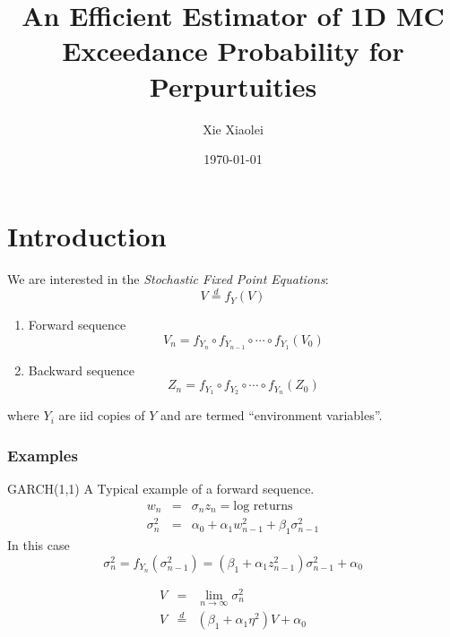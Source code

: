 \documentclass{beamer}
\title{An Efficient Estimator of 1D MC Exceedance Probability for Perpurtuities} %
\author{Xie Xiaolei} %
\institute[UCPH] %
{
Copenhagen University  \\ %
\medskip
\textit{xie@math.ku.dk} %
}
\date{\today} %
\begin{document}
\begin{frame}
\titlepage %
\end{frame}


\section{Introduction}
\begin{frame}
  We are interested in the {\it Stochastic Fixed Point Equations}:
  \[
  V \overset{d}{=} f_Y(V)
  \]
  \begin{enumerate}
  \item Forward sequence
    \[
    V_n = f_{Y_n} \circ f_{Y_{n-1}} \circ \cdots \circ f_{Y_1} (V_0)
    \]
    \item Backward sequence
      \[
      Z_n  = f_{Y_1} \circ f_{Y_{2}} \circ \cdots \circ f_{Y_n} (Z_0)
      \]
    \end{enumerate}
    where $Y_i$ are iid copies of $Y$ and are termed ``environment
    variables''.
\end{frame}

\begin{frame}
  \frametitle{Examples}
  \begin{exampleblock}{GARCH(1,1)}
    A Typical example of a forward sequence.
    \begin{eqnarray*}
      w_n &=& \sigma_n z_n = \text{log returns} \\
      \sigma_n^2 &=& \alpha_0 + \alpha_1 w_{n-1}^2 + \beta_1 \sigma_{n-1}^2
    \end{eqnarray*}
    In this case
    \[
    \sigma_n^2 = f_{Y_n} (\sigma_{n-1}^2) =
    (\beta_1 + \alpha_1 z_{n-1}^2) \sigma_{n-1}^2
    + \alpha_0
    \]
  \end{exampleblock}
    \begin{eqnarray*}
      V &=& \lim_{n \to \infty} \sigma_n^2   \\
      V &\overset{d}{=}& (\beta_1 + \alpha_1 \eta^2) V + \alpha_0
    \end{eqnarray*}
\end{frame}
\end{document}
